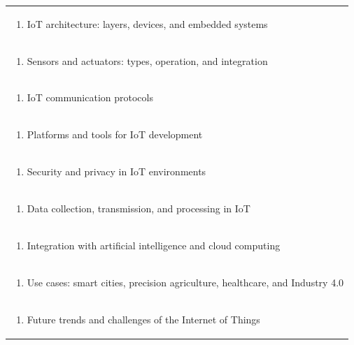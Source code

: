 \documentclass[11pt]{article}
\begin{document}
\begin{center}
\begin{longtable}{|p{4cm}|p{4cm}|p{4cm}|p{4cm}|}
\multicolumn{4}{|p{\dimexpr 16cm + 6\tabcolsep\relax}|}{\begin{enumerate}[start=2]\item IoT architecture: layers, devices, and embedded systems\end{enumerate}}\\
\multicolumn{4}{|p{\dimexpr 16cm + 6\tabcolsep\relax}|}{\begin{enumerate}[start=3]\item Sensors and actuators: types, operation, and integration\end{enumerate}}\\
\multicolumn{4}{|p{\dimexpr 16cm + 6\tabcolsep\relax}|}{\begin{enumerate}[start=4]\item IoT communication protocols\end{enumerate}}\\
\multicolumn{4}{|p{\dimexpr 16cm + 6\tabcolsep\relax}|}{\begin{enumerate}[start=5]\item Platforms and tools for IoT development\end{enumerate}}\\
\multicolumn{4}{|p{\dimexpr 16cm + 6\tabcolsep\relax}|}{\begin{enumerate}[start=6]\item Security and privacy in IoT environments\end{enumerate}}\\
\multicolumn{4}{|p{\dimexpr 16cm + 6\tabcolsep\relax}|}{\begin{enumerate}[start=7]\item Data collection, transmission, and processing in IoT\end{enumerate}}\\
\multicolumn{4}{|p{\dimexpr 16cm + 6\tabcolsep\relax}|}{\begin{enumerate}[start=8]\item Integration with artificial intelligence and cloud computing\end{enumerate}}\\
\multicolumn{4}{|p{\dimexpr 16cm + 6\tabcolsep\relax}|}{\begin{enumerate}[start=9]\item Use cases: smart cities, precision agriculture, healthcare, and Industry 4.0\end{enumerate}}\\
\multicolumn{4}{|p{\dimexpr 16cm + 6\tabcolsep\relax}|}{\begin{enumerate}[start=10]\item Future trends and challenges of the Internet of Things\end{enumerate}}\\

\end{longtable}
\end{center}
\end{document}
